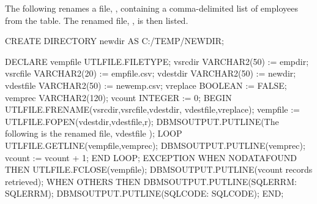 \documentclass[letterpaper,10pt,english,openany,oneside]{sphinxmanual}
\begin{document}
\newpage


The following renames a file, , containing
a comma-delimited list of employees from the  table. The renamed
file, , is then listed.

%
\begin{sphinxVerbatim}[commandchars=\\\{\}]
CREATE DIRECTORY \PYGZdq{}newdir\PYGZdq{} AS \PYGZsq{}C:/TEMP/NEWDIR\PYGZsq{};

DECLARE
    v\PYGZus{}empfile       UTL\PYGZus{}FILE.FILE\PYGZus{}TYPE;
    v\PYGZus{}src\PYGZus{}dir       VARCHAR2(50) := \PYGZsq{}empdir\PYGZsq{};
    v\PYGZus{}src\PYGZus{}file      VARCHAR2(20) := \PYGZsq{}empfile.csv\PYGZsq{};
    v\PYGZus{}dest\PYGZus{}dir      VARCHAR2(50) := \PYGZsq{}newdir\PYGZsq{};
    v\PYGZus{}dest\PYGZus{}file     VARCHAR2(50) := \PYGZsq{}newemp.csv\PYGZsq{};
    v\PYGZus{}replace       BOOLEAN := FALSE;
    v\PYGZus{}emprec        VARCHAR2(120);
    v\PYGZus{}count         INTEGER := 0;
BEGIN
    UTL\PYGZus{}FILE.FRENAME(v\PYGZus{}src\PYGZus{}dir,v\PYGZus{}src\PYGZus{}file,v\PYGZus{}dest\PYGZus{}dir,
        v\PYGZus{}dest\PYGZus{}file,v\PYGZus{}replace);
    v\PYGZus{}empfile := UTL\PYGZus{}FILE.FOPEN(v\PYGZus{}dest\PYGZus{}dir,v\PYGZus{}dest\PYGZus{}file,\PYGZsq{}r\PYGZsq{});
    DBMS\PYGZus{}OUTPUT.PUT\PYGZus{}LINE(\PYGZsq{}The following is the renamed file, \PYGZsq{}\PYGZsq{}\PYGZsq{} \textbar{}\textbar{}
        v\PYGZus{}dest\PYGZus{}file \textbar{}\textbar{} \PYGZsq{}\PYGZsq{}\PYGZsq{}\PYGZsq{});
    LOOP
        UTL\PYGZus{}FILE.GET\PYGZus{}LINE(v\PYGZus{}empfile,v\PYGZus{}emprec);
        DBMS\PYGZus{}OUTPUT.PUT\PYGZus{}LINE(v\PYGZus{}emprec);
        v\PYGZus{}count := v\PYGZus{}count + 1;
    END LOOP;
    EXCEPTION
        WHEN NO\PYGZus{}DATA\PYGZus{}FOUND THEN
            UTL\PYGZus{}FILE.FCLOSE(v\PYGZus{}empfile);
            DBMS\PYGZus{}OUTPUT.PUT\PYGZus{}LINE(v\PYGZus{}count \textbar{}\textbar{} \PYGZsq{} records retrieved\PYGZsq{});
        WHEN OTHERS THEN
            DBMS\PYGZus{}OUTPUT.PUT\PYGZus{}LINE(\PYGZsq{}SQLERRM: \PYGZsq{} \textbar{}\textbar{} SQLERRM);
            DBMS\PYGZus{}OUTPUT.PUT\PYGZus{}LINE(\PYGZsq{}SQLCODE: \PYGZsq{} \textbar{}\textbar{} SQLCODE);
END;


\end{sphinxVerbatim}
\end{document}
